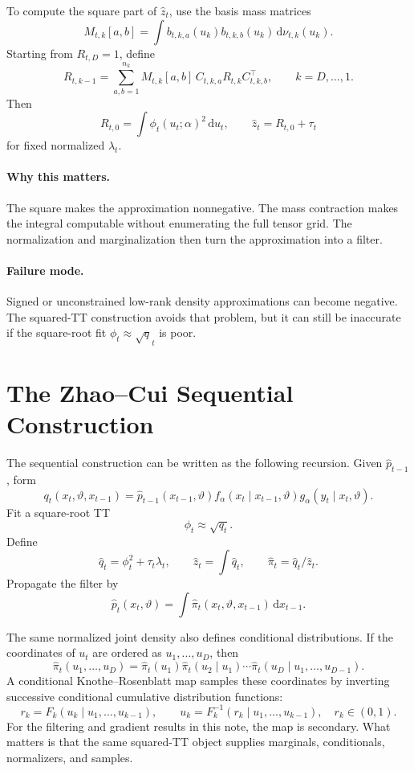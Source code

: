 \documentclass[11pt]{article}
\newcommand{\dd}{\mathrm{d}}
\renewcommand{\[}{\begin{equation}}
\renewcommand{\]}{\end{equation}}
\theoremstyle{definition}
\theoremstyle{remark}
\begin{document}
To compute the square part of \(\widehat z_t\), use the basis mass matrices
\[
  M_{t,k}[a,b]
  =
  \int b_{t,k,a}(u_k)b_{t,k,b}(u_k)\,\dd\nu_{t,k}(u_k).
  \label{eq:p14-mass-matrix}
\]
Starting from \(R_{t,D}=1\), define
\[
  R_{t,k-1}
  =
  \sum_{a,b=1}^{n_k}
  M_{t,k}[a,b]\,
  C_{t,k,a}R_{t,k}C_{t,k,b}^{\top},
  \qquad k=D,\ldots,1.
  \label{eq:p14-mass-contraction}
\]
Then
\[
  R_{t,0}
  =
  \int \phi_t(u_t;\alpha)^2\,\dd u_t,
  \qquad
  \widehat z_t=R_{t,0}+\tau_t
  \label{eq:p14-z-from-R}
\]
for fixed normalized \(\lambda_t\).

\paragraph{Why this matters.}
The square makes the approximation nonnegative.  The mass contraction makes
the integral computable without enumerating the full tensor grid.  The
normalization and marginalization then turn the approximation into a filter.

\paragraph{Failure mode.}
Signed or unconstrained low-rank density approximations can become negative.
The squared-TT construction avoids that problem, but it can still be inaccurate
if the square-root fit \(\phi_t\approx\sqrt q_t\) is poor.

\section{The Zhao--Cui Sequential Construction}

The sequential construction can be written as the following recursion.  Given
\(\widehat p_{t-1}\), form
\[
  q_t(x_t,\vartheta,x_{t-1})
  =
  \widehat p_{t-1}(x_{t-1},\vartheta)
  f_\alpha(x_t\mid x_{t-1},\vartheta)
  g_\alpha(y_t\mid x_t,\vartheta).
  \label{eq:p14-zc-q}
\]
Fit a square-root TT
\[
  \phi_t\approx\sqrt{q_t}.
  \label{eq:p14-zc-root-fit}
\]
Define
\[
  \widehat q_t=\phi_t^2+\tau_t\lambda_t,\qquad
  \widehat z_t=\int\widehat q_t,\qquad
  \widehat\pi_t=\widehat q_t/\widehat z_t.
  \label{eq:p14-zc-normalize}
\]
Propagate the filter by
\[
  \widehat p_t(x_t,\vartheta)
  =
  \int \widehat\pi_t(x_t,\vartheta,x_{t-1})\,\dd x_{t-1}.
  \label{eq:p14-zc-propagate}
\]

The same normalized joint density also defines conditional distributions.  If
the coordinates of \(u_t\) are ordered as \(u_1,\ldots,u_D\), then
\[
  \widehat\pi_t(u_1,\ldots,u_D)
  =
  \widehat\pi_t(u_1)
  \widehat\pi_t(u_2\mid u_1)\cdots
  \widehat\pi_t(u_D\mid u_1,\ldots,u_{D-1}).
  \label{eq:p14-conditional-factorization}
\]
A conditional Knothe--Rosenblatt map samples these coordinates by inverting
successive conditional cumulative distribution functions:
\[
  r_k
  =
  F_k(u_k\mid u_1,\ldots,u_{k-1}),
  \qquad
  u_k
  =
  F_k^{-1}(r_k\mid u_1,\ldots,u_{k-1}),
  \quad r_k\in(0,1).
  \label{eq:p14-kr}
\]
For the filtering and gradient results in this note, the map is secondary.
What matters is that the same squared-TT object supplies marginals,
conditionals, normalizers, and samples.
\end{document}
